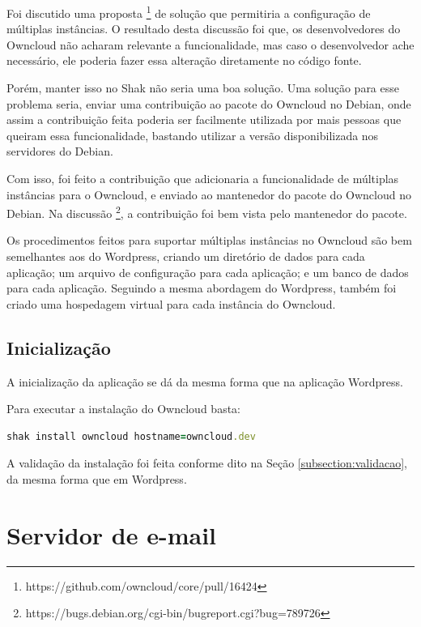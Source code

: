 Foi discutido uma proposta \footnote{https://github.com/owncloud/core/pull/16424} 
de solução que permitiria a configuração de múltiplas instâncias. O
resultado desta discussão foi que, os desenvolvedores do Owncloud não acharam relevante
a funcionalidade, mas caso o desenvolvedor ache necessário, ele poderia fazer essa
alteração diretamente no código fonte.

Porém, manter isso no Shak não seria uma boa solução. Uma solução para esse problema seria, 
enviar uma contribuição ao pacote do Owncloud no Debian, onde assim a contribuição feita
poderia ser facilmente utilizada por mais pessoas que queiram essa funcionalidade,
bastando utilizar a versão disponibilizada nos servidores do Debian. 

Com isso, foi feito a contribuição que adicionaria a funcionalidade de múltiplas 
instâncias para o Owncloud, e enviado ao mantenedor do pacote do Owncloud no Debian. 
Na discussão \footnote{https://bugs.debian.org/cgi-bin/bugreport.cgi?bug=789726},
a contribuição foi bem vista pelo mantenedor do pacote.
 
Os procedimentos feitos para suportar múltiplas instâncias
no Owncloud são bem semelhantes aos do Wordpress, criando um diretório de dados
para cada aplicação; um arquivo de configuração para cada aplicação; e um banco de
dados para cada aplicação. Seguindo a mesma abordagem do Wordpress, também
foi criado uma hospedagem virtual para cada instância do Owncloud.

\subsection{Inicialização}

A inicialização da aplicação se dá da mesma forma que na aplicação Wordpress.

Para executar a instalação do Owncloud basta:

\begin{lstlisting}[basicstyle=\ttfamily, language=Ruby,label=dice_index,caption={Exemplo de execução de instalação do Owncloud com shak}]
shak install owncloud hostname=owncloud.dev
\end{lstlisting}

A validação da instalação foi feita conforme dito na Seção \ref{subsection:validacao}, 
da mesma forma que em Wordpress.

\section{Servidor de e-mail}
\label{sub:e-mail}

